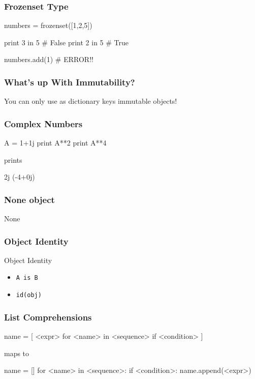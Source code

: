 \begin{frame}[fragile]
\frametitle{Frozenset Type}

\begin{python}
numbers = frozenset([1,2,5])

print 3 in 5 # False
print 2 in 5 # True

numbers.add(1) # ERROR!!
\end{python}

\end{frame}

\begin{frame}[fragile]
\frametitle{What's up With Immutability?}

You can only use as dictionary keys \alert{immutable} objects!
\end{frame}

\begin{frame}[fragile]
\frametitle{Complex Numbers}
\begin{python}
A = 1+1j
print A**2
print A**4
\end{python}

prints

\begin{python}
2j
(-4+0j)
\end{python}
\end{frame}


\begin{frame}[fragile]
\frametitle{None object}

\begin{python}
None
\end{python}
\end{frame}

\begin{frame}[fragile]
\frametitle{Object Identity}

\begin{block}{Object Identity}
\begin{itemize}
\item \lstinline{A is B}
\item \lstinline{id(obj)}
\end{itemize}
\end{block}

\end{frame}

\begin{frame}[fragile]
\frametitle{List Comprehensions}

\begin{python}
name = [ <expr> for <name> in <sequence> if <condition> ]
\end{python}

maps to

\begin{python}
name = []
for <name> in <sequence>:
    if <condition>:
        name.append(<expr>)
\end{python}

\end{frame}

